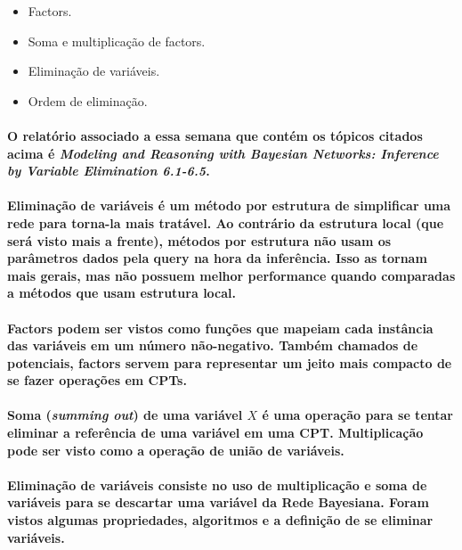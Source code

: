 \documentclass[a4paper,10pt]{article}
\theoremstyle{plain}
\begin{document}
\begin{itemize}
  \item Factors.
  \item Soma e multiplicação de factors.
  \item Eliminação de variáveis.
  \item Ordem de eliminação.
\end{itemize}

\paragraph{
  O relatório associado a essa semana que contém os tópicos citados acima é \textit{Modeling and
  Reasoning with Bayesian Networks: Inference by Variable Elimination 6.1-6.5}\cite{report-2}.
}

\paragraph{
  Eliminação de variáveis é um método por estrutura de simplificar uma rede para torna-la mais
  tratável. Ao contrário da estrutura local (que será visto mais a frente), métodos por estrutura
  não usam os parâmetros dados pela query na hora da inferência. Isso as tornam mais gerais, mas
  não possuem melhor performance quando comparadas a métodos que usam estrutura local.
}

\paragraph{
  Factors podem ser vistos como funções que mapeiam cada instância das variáveis em um número
  não-negativo. Também chamados de potenciais, factors servem para representar um jeito mais
  compacto de se fazer operações em CPTs.
}

\paragraph{
  Soma (\textit{summing out}) de uma variável $X$ é uma operação para se tentar eliminar a
  referência de uma variável em uma CPT. Multiplicação pode ser visto como a operação de união de
  variáveis.
}

\paragraph{
  Eliminação de variáveis consiste no uso de multiplicação e soma de variáveis para se descartar
  uma variável da Rede Bayesiana. Foram vistos algumas propriedades, algoritmos e a definição de
  se eliminar variáveis.
}
\end{document}
